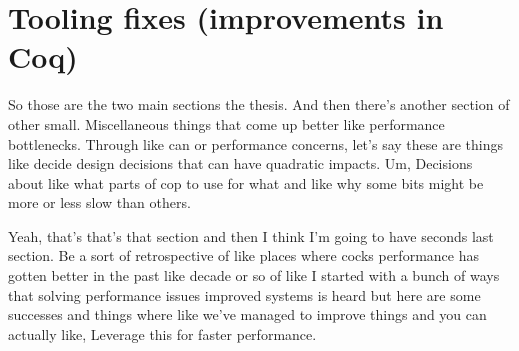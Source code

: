 \chapter{Tooling fixes (improvements in Coq)} \label{ch:coq-tooling-fixes}

So those are the two main sections the thesis. And then there's another section of other small. Miscellaneous things that come up better like performance bottlenecks. Through like can or performance concerns, let's say these are things like decide design decisions that can have quadratic impacts. Um, Decisions about like what parts of cop to use for what and like why some bits might be more or less slow than others. 

Yeah, that's that's that section and then I think I'm going to have seconds last section. Be a sort of retrospective of like places where cocks performance has gotten better in the past like decade or so of like I started with a bunch of ways that solving performance issues improved systems is heard but here are some successes and things where like we've managed to improve things and you can actually like, Leverage this for faster performance. 



